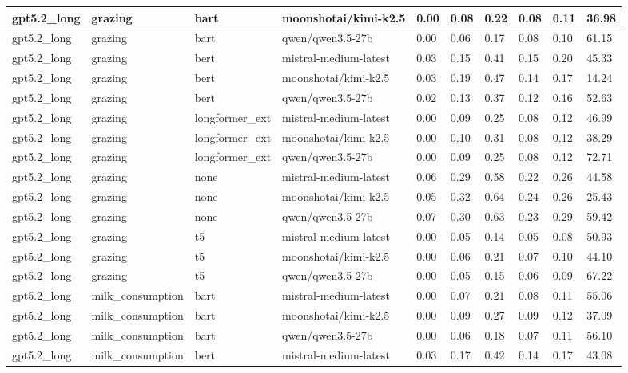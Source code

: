 \begin{tabular}{|l|l|l|l|l|l|l|l|l|l|}
 \hline
 gpt5.2\_long & grazing & bart & moonshotai/kimi-k2.5 & 0.00 & 0.08 & 0.22 & 0.08 & 0.11 & 36.98 \\
 \hline
 gpt5.2\_long & grazing & bart & qwen/qwen3.5-27b & 0.00 & 0.06 & 0.17 & 0.08 & 0.10 & 61.15 \\
 \hline
 gpt5.2\_long & grazing & bert & mistral-medium-latest & 0.03 & 0.15 & 0.41 & 0.15 & 0.20 & 45.33 \\
 \hline
 gpt5.2\_long & grazing & bert & moonshotai/kimi-k2.5 & 0.03 & 0.19 & 0.47 & 0.14 & 0.17 & 14.24 \\
 \hline
 gpt5.2\_long & grazing & bert & qwen/qwen3.5-27b & 0.02 & 0.13 & 0.37 & 0.12 & 0.16 & 52.63 \\
 \hline
 gpt5.2\_long & grazing & longformer\_ext & mistral-medium-latest & 0.00 & 0.09 & 0.25 & 0.08 & 0.12 & 46.99 \\
 \hline
 gpt5.2\_long & grazing & longformer\_ext & moonshotai/kimi-k2.5 & 0.00 & 0.10 & 0.31 & 0.08 & 0.12 & 38.29 \\
 \hline
 gpt5.2\_long & grazing & longformer\_ext & qwen/qwen3.5-27b & 0.00 & 0.09 & 0.25 & 0.08 & 0.12 & 72.71 \\
 \hline
 gpt5.2\_long & grazing & none & mistral-medium-latest & 0.06 & 0.29 & 0.58 & 0.22 & 0.26 & 44.58 \\
 \hline
 gpt5.2\_long & grazing & none & moonshotai/kimi-k2.5 & 0.05 & 0.32 & 0.64 & 0.24 & 0.26 & 25.43 \\
 \hline
 gpt5.2\_long & grazing & none & qwen/qwen3.5-27b & 0.07 & 0.30 & 0.63 & 0.23 & 0.29 & 59.42 \\
 \hline
 gpt5.2\_long & grazing & t5 & mistral-medium-latest & 0.00 & 0.05 & 0.14 & 0.05 & 0.08 & 50.93 \\
 \hline
 gpt5.2\_long & grazing & t5 & moonshotai/kimi-k2.5 & 0.00 & 0.06 & 0.21 & 0.07 & 0.10 & 44.10 \\
 \hline
 gpt5.2\_long & grazing & t5 & qwen/qwen3.5-27b & 0.00 & 0.05 & 0.15 & 0.06 & 0.09 & 67.22 \\
 \hline
 gpt5.2\_long & milk\_consumption & bart & mistral-medium-latest & 0.00 & 0.07 & 0.21 & 0.08 & 0.11 & 55.06 \\
 \hline
 gpt5.2\_long & milk\_consumption & bart & moonshotai/kimi-k2.5 & 0.00 & 0.09 & 0.27 & 0.09 & 0.12 & 37.09 \\
 \hline
 gpt5.2\_long & milk\_consumption & bart & qwen/qwen3.5-27b & 0.00 & 0.06 & 0.18 & 0.07 & 0.11 & 56.10 \\
 \hline
 gpt5.2\_long & milk\_consumption & bert & mistral-medium-latest & 0.03 & 0.17 & 0.42 & 0.14 & 0.17 & 43.08 \\

\end{tabular}
